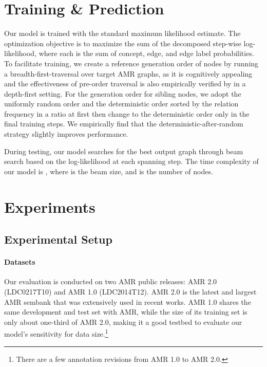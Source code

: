 \documentclass[11pt,a4paper]{article}
\begin{document}
	\section{Training \& Prediction}
	Our model is trained with the standard maximum likelihood estimate. The optimization objective is to maximize the sum of the decomposed step-wise log-likelihood, where each is the sum of concept, edge, and edge label probabilities. To facilitate training, we create a reference generation order of nodes by running a breadth-first-traversal over target AMR graphs, as it is cognitively appealing \cite[core-semantic-first principle,][]{cai-lam-2019-core} and the effectiveness of pre-order traversal is also empirically verified by  in a depth-first setting. For the generation order for sibling nodes, we adopt the uniformly random order and the deterministic order sorted by the relation frequency in a  ratio at first then change to the deterministic order only in the final training steps. We empirically find that the deterministic-after-random strategy slightly improves performance.
	
	During testing, our model searches for the best output graph through beam search based on the log-likelihood at each spanning step. The time complexity of our model is , where  is the beam size, and  is the number of nodes.
	\section{Experiments}
	\subsection{Experimental Setup}
	\paragraph{Datasets} Our evaluation is conducted on two AMR public releases: AMR 2.0 (LDC0217T10) and AMR 1.0 (LDC2014T12). AMR 2.0 is the latest and largest AMR sembank that was extensively used in recent works. AMR 1.0 shares the same development and test set with AMR, while the size of its training set is only about one-third of AMR 2.0, making it a good testbed to evaluate our model's sensitivity for data size.\footnote{There are a few annotation revisions from AMR 1.0 to AMR 2.0.}
\end{document}
